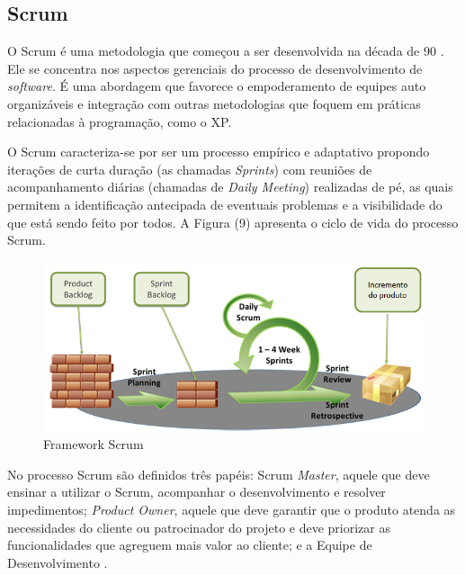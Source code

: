 \subsection[Scrum]{Scrum}

O Scrum é uma metodologia que começou a ser desenvolvida na década de 90 \cite{ken}. Ele se concentra nos aspectos gerenciais do processo de desenvolvimento de \textit{software}. É uma abordagem que favorece o empoderamento de equipes auto organizáveis e integração com outras metodologias que foquem em práticas relacionadas à programação, como o XP.

O Scrum caracteriza-se por ser um processo empírico e adaptativo propondo iterações de curta duração (as chamadas \textit{Sprints}) com reuniões de acompanhamento diárias (chamadas de \textit{Daily Meeting}) realizadas de pé, as quais permitem a identificação antecipada de eventuais problemas e a visibilidade do que está sendo feito por todos. A Figura (9) apresenta o ciclo de vida do processo Scrum.

\begin{figure}[h]
	\centering
		\label{fig01}
			\includegraphics[scale=0.8]{figuras/scrum.png}
		\caption{Framework Scrum}
\end{figure}

No processo Scrum são definidos três papéis: Scrum \textit{Master}, aquele que deve ensinar a utilizar o Scrum, acompanhar o desenvolvimento e resolver impedimentos; \textit{Product Owner}, aquele que deve garantir que o produto atenda as necessidades do cliente ou patrocinador do projeto e deve priorizar as funcionalidades que agreguem mais valor ao cliente; e a Equipe de Desenvolvimento   \cite{jeff}.

